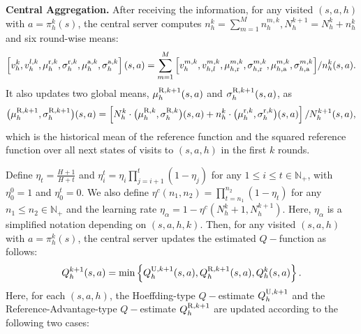 \documentclass{article}
\newcommand{\U}{\textnormal{U}}
\newcommand{\R}{\textnormal{R}}
\newcommand{\nr}{\textnormal{r}}
\newcommand{\na}{\textnormal{a}}
\begin{document}
 
\textbf{Central Aggregation.} 
After receiving the information, for any visited \( (s,a,h) \) with \( a = \pi_h^k(s) \), the central server computes $n_h^{k} = \sum_{m=1}^M n_h^{m,k},N_h^{k+1} = N_h^k + n_h^k$ and six round-wise means:
\begin{equation}
\label{roundwisemeans}
    \left[v_h^k, v_h^{l,k}, \mu_h^{\nr, k}, \sigma_h^{\nr, k},\mu_h^{\na, k}, \sigma_h^{\na, k}\right](s,a) = \sum_{m=1}^M\Big[v_{h}^{m,k}, v_{h,l}^{m,k}, \mu_{h,\nr}^{m,k}, \sigma_{h,\nr}^{m,k}, \mu_{h,\na}^{m,k}, \sigma_{h,\na}^{m,k}\Big]/n_h^{k}(s,a).
\end{equation}
It also updates two global means, $\mu_h^{\R,k+1}(s,a)$ and $\sigma_h^{\R,k+1}(s,a)$, as
    \begin{equation}
        \label{muref}
        \big(\mu_h^{\R,k+1},\sigma_h^{\R,k+1}\big)(s,a) = \left[N_h^k\cdot\big(\mu_h^{\R,k},\sigma_h^{\R,k}\big)(s,a)+n_h^k\cdot\big(\mu_h^{\nr,k},\sigma_h^{\nr,k}\big)(s,a)\right]/N_h^{k+1}(s,a),
    \end{equation}
which is the historical mean of the reference function and the squared reference function over all next states of visits to $(s,a,h)$ in the first $k$ rounds.
    
Define \( \eta_t = \frac{H+1}{H+t} \) and \( \eta_i^t = \eta_i \prod_{j=i+1}^t (1 - \eta_j) \) for any \( 1 \leq i \leq t \in \mathbb{N}_+\), with \( \eta_0^0 = 1 \) and \( \eta_0^t = 0 \). We also define \( \eta^c(n_1, n_2) = \prod_{t=n_1}^{n_2}(1 - \eta_t) \) for any \( n_1 \leq n_2 \in \mathbb{N}_+ \) and the learning rate $\eta_{\alpha} = 1-\eta^c(N_h^k+1,N_h^{k+1})$. Here, $\eta_\alpha$ is a simplified notation depending on $(s,a,h,k)$.  
Then, for any visited \( (s,a,h) \) with \( a = \pi_h^k(s) \), the central server updates the estimated \( Q-\)function as follows:
    \begin{equation}\label{update_q}
        Q_h^{k+1}(s,a) = \min \left\{Q_h^{\U, k+1}(s,a), Q_h^{\R, k+1}(s,a), Q_h^{k}(s,a)\right\}.
    \end{equation}
Here, for each $(s,a,h)$, the Hoeffding-type $Q-$estimate $Q_h^{\U, k+1}$ \cite{jin2018q, zheng2023federated} and the Reference-Advantage-type $Q-$estimate $Q_h^{\R, k+1}$  \cite{li2023breaking, zhang2020almost} are updated according to the following two cases: 
\end{document}

